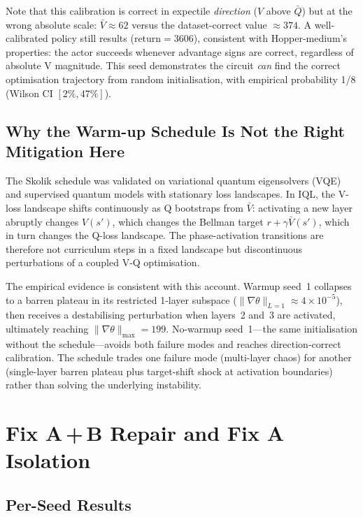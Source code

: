 \documentclass[10pt,a4paper]{article}
\begin{document}
Note that this calibration is correct in expectile \emph{direction}
($V$ above $\bar Q$) but at the wrong absolute scale: $\bar V\approx62$
versus the dataset-correct value $\approx374$.
A well-calibrated policy still results ($\text{return}=3606$), consistent
with Hopper-medium's properties: the actor succeeds whenever advantage signs
are correct, regardless of absolute V magnitude.
This seed demonstrates the circuit \emph{can} find the correct optimisation
trajectory from random initialisation, with empirical probability 1/8
(Wilson CI $[2\%,47\%]$).

\subsection{Why the Warm-up Schedule Is Not the Right Mitigation Here}

The Skolik schedule was validated on variational quantum eigensolvers (VQE)
and supervised quantum models with stationary loss landscapes.
In IQL, the V-loss landscape shifts continuously as Q bootstraps from
$\bar{V}$: activating a new layer abruptly changes $V(s')$, which changes the
Bellman target $r+\gamma\bar{V}(s')$, which in turn changes the Q-loss
landscape.
The phase-activation transitions are therefore not curriculum steps in a fixed
landscape but discontinuous perturbations of a coupled V-Q optimisation.

The empirical evidence is consistent with this account. Warmup seed~1 collapses
to a barren plateau in its restricted 1-layer subspace
($\|\nabla\theta\|_{L=1}\approx4\times10^{-5}$), then receives a destabilising
perturbation when layers~2 and~3 are activated, ultimately reaching
$\|\nabla\theta\|_\text{max}=199$.
No-warmup seed~1---the same initialisation without the schedule---avoids both
failure modes and reaches direction-correct calibration.
The schedule trades one failure mode (multi-layer chaos) for another
(single-layer barren plateau plus target-shift shock at activation
boundaries) rather than solving the underlying instability.

\section{Fix A\,+\,B Repair and Fix A Isolation}
\label{sec:fixab}

\subsection{Per-Seed Results}
\end{document}
